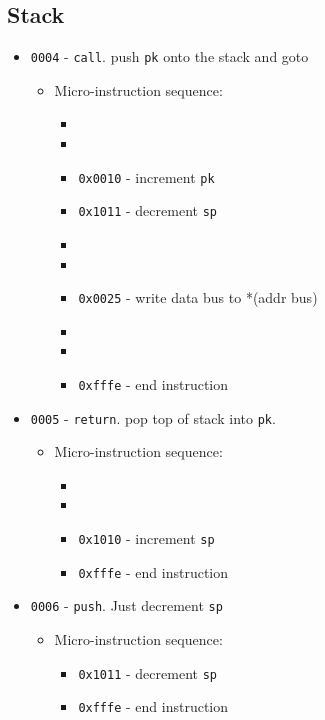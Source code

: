 \documentclass{article}
\def\incrementpk    {\Verb|0x0010| - increment \Verb|pk|}
\def\incrementsp    {\Verb|0x1010| - increment \Verb|sp|}
\def\decrementsp    {\Verb|0x1011| - decrement \Verb|sp|}
\def\writeRAM       {\Verb|0x0025| - write data bus to *(addr bus)}
\def\done{\Verb|0xfffe| - end instruction}
\begin{document}
\subsection{Stack}
\begin{itemize}
    \item \Verb|0004| - \Verb|call|. push \Verb|pk| onto the stack and goto
    \begin{itemize}
        \item Micro-instruction sequence:
        \begin{itemize}
            \item \pkptrout
            \item \datatotmpa
            \item \incrementpk
            \item \decrementsp
            \item \sptoaddr
            \item \pktodata
            \item \writeRAM
            \item \tmpatodata
            \item \datatopk
            \item \done
        \end{itemize}
    \end{itemize}

    \item \Verb|0005| - \Verb|return|. pop top of stack into \Verb|pk|.
    \begin{itemize}
        \item Micro-instruction sequence:
        \begin{itemize}
            \item \spptodata
            \item \datatopk
            \item \incrementsp
            \item \done
        \end{itemize}
    \end{itemize}

    \item \Verb|0006| - \Verb|push|. Just decrement \Verb|sp|
    \begin{itemize}
        \item Micro-instruction sequence:
        \begin{itemize}
            \item \decrementsp
            \item \done
        \end{itemize}
    \end{itemize}
    

\end{itemize}
\end{document}
